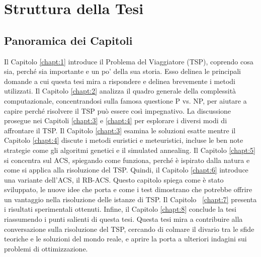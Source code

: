 
\section{Struttura della Tesi}

\subsection{Panoramica dei Capitoli}
Il Capitolo \ref{chapt:1} introduce il Problema del Viaggiatore (TSP), coprendo cosa sia, perché sia importante e un po' della sua storia. Esso delinea le principali domande a cui questa tesi mira a rispondere e delinea brevemente i metodi utilizzati.
Il Capitolo \ref{chapt:2} analizza il quadro generale della complessità computazionale, concentrandosi sulla famosa questione P vs. NP, per aiutare a capire perché risolvere il \gls{TSP} può essere così impegnativo.
La discussione prosegue nei Capitoli \ref{chapt:3} e \ref{chapt:4} per esplorare i diversi modi di affrontare il \gls{TSP}.  Il Capitolo \ref{chapt:3} esamina le soluzioni esatte mentre il Capitolo \ref{chapt:4} discute i metodi euristici e meteuristici, incluse le ben note strategie come gli algoritmi genetici e il simulated annealing.
Il Capitolo \ref{chapt:5} si concentra sul \gls{ACS}, spiegando come funziona, perché è ispirato dalla natura e come si applica alla risoluzione del \gls{TSP}.
Quindi, il Capitolo \ref{chapt:6} introduce una variante dell'\gls{ACS}, il \gls{RB-ACS}. Questo capitolo spiega come è stato sviluppato, le nuove idee che porta e come i test dimostrano che potrebbe offrire un vantaggio nella risoluzione delle istanze di \gls{TSP}.
Il Capitolo ~\ref{chapt:7} presenta i risultati sperimentali ottenuti.
Infine, il Capitolo \ref{chapt:8} conclude la tesi riassumendo i punti salienti di questa tesi.
Questa tesi mira a contribuire alla conversazione sulla risoluzione del \gls{TSP}, cercando di colmare il divario tra le sfide teoriche e le soluzioni del mondo reale, e aprire la porta a ulteriori indagini sui problemi di ottimizzazione.
